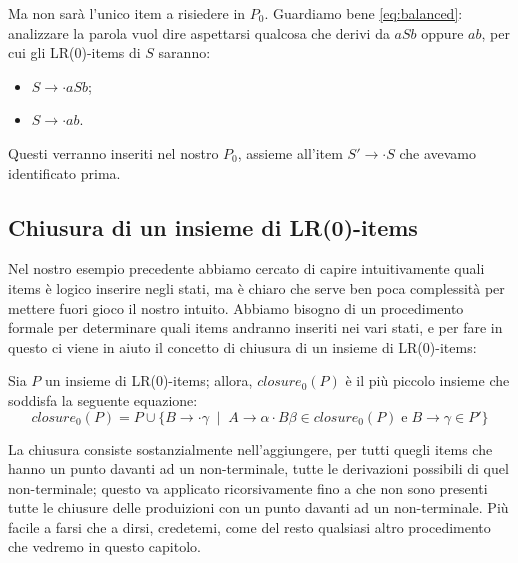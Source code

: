\documentclass[class=book, crop=false, oneside, 12pt]{standalone}
\begin{document}
Ma non sarà l'unico item a risiedere in \(P_0\).  Guardiamo bene \ref{eq:balanced}: analizzare la parola vuol dire aspettarsi qualcosa che derivi da \(aSb\) oppure \(ab\), per cui gli LR(0)-items di \(S\) saranno:
\begin{itemize}
    \item \(S \to \cdot aSb\);
    \item \(S \to \cdot ab\).
\end{itemize}
Questi verranno inseriti nel nostro \(P_0\), assieme all'item \(S' \to \cdot S\) che avevamo identificato prima. 

\subsection{Chiusura di un insieme di LR(0)-items}
Nel nostro esempio precedente abbiamo cercato di capire intuitivamente quali items è logico inserire negli stati, ma è chiaro che serve ben poca complessità per mettere fuori gioco il nostro intuito. Abbiamo bisogno di un procedimento formale per determinare quali items andranno inseriti nei vari stati, e per fare in questo ci viene in aiuto il concetto di chiusura di un insieme di LR(0)-items:

\begin{definition}
    Sia \(P\) un insieme di LR(0)-items; allora, \(closure_0(P)\) è il più piccolo insieme che soddisfa la seguente equazione:
    \begin{equation}
        closure_0(P) = P \cup \{B \to \cdot \gamma \; \mid \; A \to \alpha \cdot B \beta \in closure_0(P) \; \textrm{e} \; B \to \gamma \in P'\}
    \end{equation}
\end{definition}

La chiusura consiste sostanzialmente nell'aggiungere, per tutti quegli items che hanno un punto davanti ad un non-terminale, tutte le derivazioni possibili di quel non-terminale; questo va applicato ricorsivamente fino a che non sono presenti tutte le chiusure delle produizioni con un punto davanti ad un non-terminale. Più facile a farsi che a dirsi, credetemi, come del resto qualsiasi altro procedimento che vedremo in questo capitolo.
\end{document}
